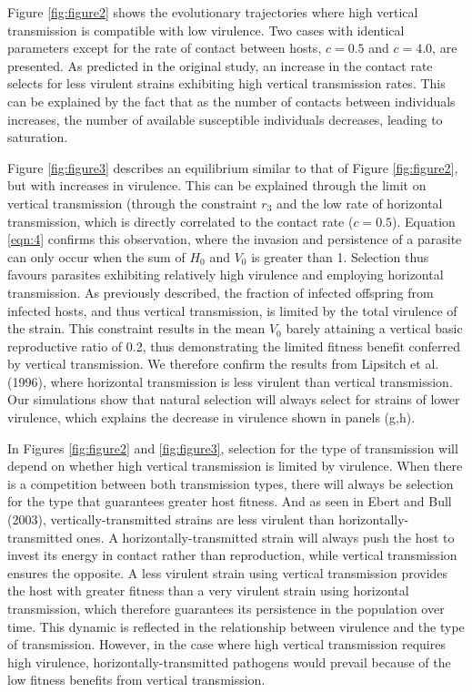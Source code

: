 Figure \ref{fig:figure2} shows the evolutionary trajectories where high vertical
transmission is compatible with low virulence. Two cases with identical
parameters except for the rate of contact between hosts, $c = 0.5$ and
$c = 4.0$, are presented. As predicted in the original study, an increase in the
contact rate selects for less virulent strains exhibiting high vertical
transmission rates. This can be explained by the fact that as the number of
contacts between individuals increases, the number of available susceptible
individuals decreases, leading to saturation.

Figure \ref{fig:figure3} describes an equilibrium similar to that of Figure
\ref{fig:figure2}, but with increases in virulence. This can be explained
through the limit on vertical transmission (through the constraint $r_3$ \in
[0, $r_1$] and the low rate of horizontal transmission, which is directly
correlated to the contact rate ($c = 0.5$). Equation \ref{eqn:4} confirms this
observation, where the invasion and persistence of a parasite can only occur
when the sum of $H_0$ and $V_0$ is greater than 1. Selection thus favours
parasites exhibiting relatively high virulence and employing horizontal
transmission. As previously described, the fraction of infected offspring from
infected hosts, and thus vertical transmission, is limited by the total
virulence of the strain. This constraint results in the mean $V_0$ barely
attaining a vertical basic reproductive ratio of 0.2, thus demonstrating the
limited fitness benefit conferred by vertical transmission. We therefore
confirm the results from Lipsitch et al. (1996)\supercite{Lipsitch:1996}, where
horizontal transmission is less virulent than vertical transmission. Our
simulations show that natural selection will always select for strains of lower
virulence, which explains the decrease in virulence shown in panels (g,h).

In Figures \ref{fig:figure2} and \ref{fig:figure3}, selection for the type of
transmission will depend on whether high vertical transmission is limited by
virulence. When there is a competition between both transmission types, there
will always be selection for the type that guarantees greater host fitness. And
as seen in Ebert and Bull (2003), vertically-transmitted strains are less
virulent than horizontally-transmitted ones. A horizontally-transmitted strain
will always push the host to invest its energy in contact rather than
reproduction, while vertical transmission ensures the opposite. A less virulent
strain using vertical transmission provides the host with greater fitness than a
very virulent strain using horizontal transmission, which therefore guarantees
its persistence in the population over time. This dynamic is reflected in the
relationship between virulence and the type of transmission\supercite{Levin:1996}.
However, in the case where high vertical transmission requires high virulence,
horizontally-transmitted pathogens would prevail because of the low fitness
benefits from vertical transmission.


